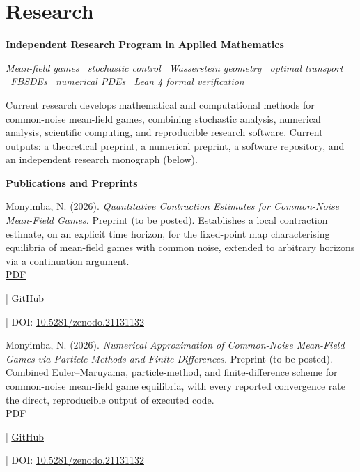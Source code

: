 \documentclass[10.5pt]{article}
\newcommand{\linkbadge}[2]{%
  \href{#1}{\underline{#2}}%
}
\newcommand{\cventry}[2]{%
  \par\noindent\textbf{#1}\hfill\makebox[1.4in][r]{#2}\par
}
\newcommand{\cvsub}[1]{%
  \par\noindent\textit{#1}\par\vspace{2pt}
}
\begin{document}
\section*{Research}

\cventry{Independent Research Program in Applied Mathematics}{2025--Present}
\cvsub{Mean-field games \textbullet\ stochastic control \textbullet\ Wasserstein geometry \textbullet\ optimal
transport \textbullet\ FBSDEs \textbullet\ numerical PDEs \textbullet\ Lean 4 formal verification}
\noindent Current research develops mathematical and computational methods for common-noise mean-field games,
combining stochastic analysis, numerical analysis, scientific computing, and reproducible research software.
Current outputs: a theoretical preprint, a numerical preprint, a software repository, and an independent
research monograph (below).

\vspace{2pt}
\noindent\textbf{Publications and Preprints}

\vspace{2pt}
\noindent Monyimba, N. (2026). \textit{Quantitative Contraction Estimates for Common-Noise Mean-Field Games.}
Preprint (to be posted). Establishes a local contraction estimate, on an explicit time horizon, for the fixed-point map
characterising equilibria of mean-field games with common noise, extended to arbitrary horizons via a
continuation argument.\\
\linkbadge{https://github.com/NisongMonyimba/AppliedMathThesis/blob/main/papers/paper1_wellposedness/main.pdf}{PDF}
\;|\;
\linkbadge{https://github.com/NisongMonyimba/AppliedMathThesis/tree/main/papers/paper1_wellposedness}{GitHub}
\;|\; DOI: \linkbadge{https://doi.org/10.5281/zenodo.21131132}{10.5281/zenodo.21131132}

\vspace{2pt}
\noindent Monyimba, N. (2026). \textit{Numerical Approximation of Common-Noise Mean-Field Games via Particle
Methods and Finite Differences.} Preprint (to be posted). Combined Euler--Maruyama, particle-method, and finite-difference
scheme for common-noise mean-field game equilibria, with every reported convergence rate the direct,
reproducible output of executed code.\\
\linkbadge{https://github.com/NisongMonyimba/AppliedMathThesis/blob/main/papers/paper2_numerics/main.pdf}{PDF}
\;|\;
\linkbadge{https://github.com/NisongMonyimba/AppliedMathThesis/tree/main/papers/paper2_numerics}{GitHub}
\;|\; DOI: \linkbadge{https://doi.org/10.5281/zenodo.21131132}{10.5281/zenodo.21131132}
\end{document}
